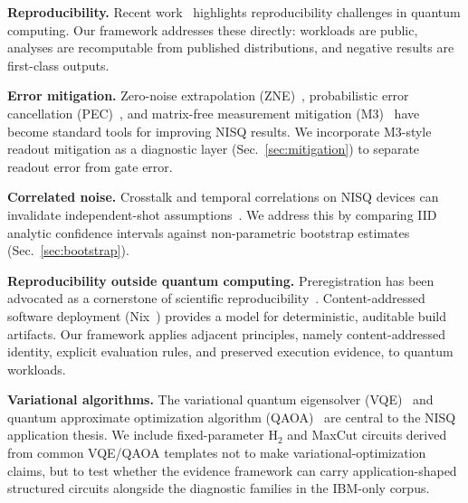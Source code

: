 \documentclass[aps,prxquantum,twocolumn,superscriptaddress,amsmath,amssymb,longbibliography,floatfix]{revtex4-2}
\begin{document}
\textbf{Reproducibility.} Recent work~\cite{Proctor2022} highlights reproducibility challenges in quantum computing. Our framework addresses these directly: workloads are public, analyses are recomputable from published distributions, and negative results are first-class outputs.

\textbf{Error mitigation.} Zero-noise extrapolation (ZNE)~\cite{Temme2017}, probabilistic error cancellation (PEC)~\cite{Li2017}, and matrix-free measurement mitigation (M3)~\cite{Nation2021} have become standard tools for improving NISQ results. We incorporate M3-style readout mitigation as a diagnostic layer (Sec.~\ref{sec:mitigation}) to separate readout error from gate error.

\textbf{Correlated noise.} Crosstalk and temporal correlations on NISQ devices can invalidate independent-shot assumptions~\cite{Sarovar2020}. We address this by comparing IID analytic confidence intervals against non-parametric bootstrap estimates~\cite{Efron1979} (Sec.~\ref{sec:bootstrap}).

\textbf{Reproducibility outside quantum computing.} Preregistration has been advocated as a cornerstone of scientific reproducibility~\cite{Nosek2018}. Content-addressed software deployment (Nix~\cite{Dolstra2006}) provides a model for deterministic, auditable build artifacts. Our framework applies adjacent principles, namely content-addressed identity, explicit evaluation rules, and preserved execution evidence, to quantum workloads.

\textbf{Variational algorithms.} The variational quantum eigensolver (VQE)~\cite{Peruzzo2014} and quantum approximate optimization algorithm (QAOA)~\cite{Farhi2014} are central to the NISQ application thesis. We include fixed-parameter H$_2$ and MaxCut circuits derived from common VQE/QAOA templates not to make variational-optimization claims, but to test whether the evidence framework can carry application-shaped structured circuits alongside the diagnostic families in the IBM-only corpus.
\end{document}
